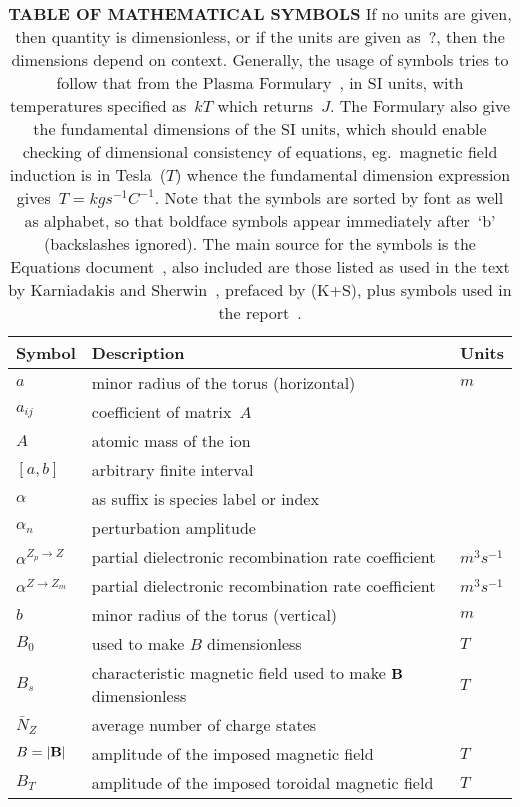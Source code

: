 \begin{longtable}{|p{3.0cm}|p{10.0cm}|p{3.0cm}|}
\caption{\textbf{\textsf{TABLE OF MATHEMATICAL SYMBOLS}}
If no units are given, then quantity is dimensionless, or if the units are given as~$?$,
then the dimensions depend on context.
Generally, the usage of symbols tries to follow that from the Plasma Formulary~\cite{NRLpf07},
in SI units, with temperatures specified as~$kT$ which returns~$J$. The Formulary also
give the fundamental dimensions of the SI units, which should enable checking of dimensional consistency of
equations, eg.\ magnetic field induction is in Tesla~($T$) whence the fundamental
dimension expression gives~$T=kg s^{-1} C^{-1}$.
Note that the symbols are sorted by font as well as alphabet, so that boldface symbols
appear immediately after~`b' (backslashes ignored). The main source for the symbols is
the Equations document~\cite{pappeqs}, also included are those listed as used in the text by
Karniadakis and Sherwin~\cite{karniadakissherwin}, prefaced by (K+S), plus symbols used in the
report~\cite{y2re313}. \label{tab:symbols}
} \\
\hline
\textbf{\textsf{Symbol}} & \textbf{\textsf{Description}}  & \textbf{\textsf{Units}} \\
\hline
$a$ & minor radius of the torus (horizontal) & $m$ \\
$a_{ij}$ & coefficient of matrix~$A$ &  \\
$A$ & atomic mass of the ion &  \\
$[a,b]$ & arbitrary finite interval  & \\
$\alpha$ & as suffix is species label or index &  \\
$\alpha_n$ & perturbation amplitude &  \\
$\alpha^{Z_p\rightarrow Z}$ & partial dielectronic recombination rate coefficient  & $m^3 s^{-1}$  \\
$\alpha^{Z\rightarrow Z_m}$ & partial dielectronic recombination rate coefficient  & $m^3 s^{-1}$  \\
$b$ & minor radius of the torus (vertical) & $m$ \\
$B_0$ & used to make $B$ dimensionless  &  $T$  \\
$B_s$ & characteristic magnetic field used to make ${\bf B}$ dimensionless  &  $T$  \\
$\bar{N}_Z$ & average number of charge states  &   \\
$B=|{\bf B}|$ & amplitude of the imposed magnetic field  &  $T$  \\
$B_T$ & amplitude of the imposed toroidal magnetic field  &  $T$ \\

\end{longtable}
